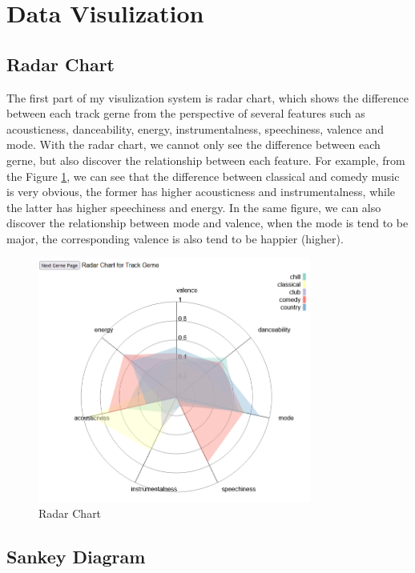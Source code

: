 \documentclass[a4paper, oneside, final, 12pt]{scrartcl} %
\begin{document}
\section{Data Visulization}

\subsection{Radar Chart}

The first part of my visulization system is radar chart, which shows the
difference between each track gerne from the perspective of several features such as
acousticness, danceability, energy, instrumentalness, speechiness, valence and mode.
With the radar chart, we cannot only see the difference between each gerne, but
also discover the relationship between each feature.
For example, from the Figure \ref{fig: radar}, we can see that the difference between
classical and comedy music is very obvious, 
the former has higher acousticness and instrumentalness,
while the latter has higher speechiness and energy.
In the same figure, we can also discover the relationship between mode and valence,
when the mode is tend to be major, 
the corresponding valence is also tend to be happier (higher).

\begin{figure}[h]
  \centering
  \includegraphics[width=0.8\textwidth]{Images/radar.png}
  \caption{Radar Chart}
  \label{fig: radar}
\end{figure}

\subsection{Sankey Diagram}
\end{document}
